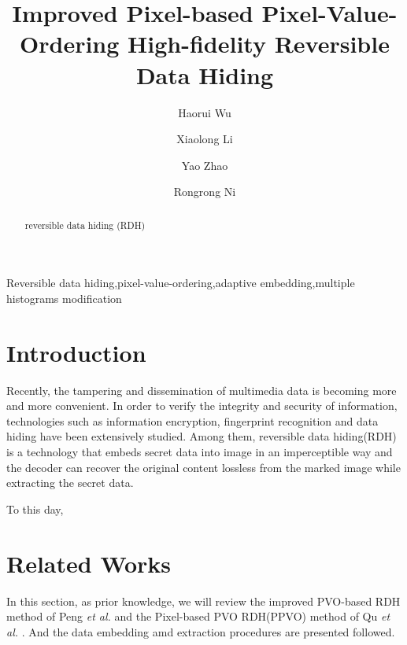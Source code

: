 \documentclass[review,3p,10pt,sort&compress]{elsarticle}
\begin{document}
\begin{frontmatter}

\title {Improved Pixel-based Pixel-Value-Ordering High-fidelity Reversible Data Hiding}

\author{Haorui Wu}

\author{Xiaolong Li}

\author{Yao Zhao}

\author{Rongrong Ni}

\address[mymainaddress]{Institute of Information Science, Beijing Jiaotong University, Beijing 100044, China}
\address[mysecondaryaddress]{Beijing Key Laboratory of Advanced Information Science and Network Technology, Beijing 100044, China}

\begin{abstract}
reversible data hiding (RDH)
\end{abstract}


\begin{keyword}
   Reversible data hiding\sep pixel-value-ordering\sep adaptive embedding\sep multiple histograms modification
\end{keyword}

\end{frontmatter}

\section{Introduction}\label{sec:1}
Recently, the tampering and dissemination of multimedia data is becoming more and more convenient. In order to verify the integrity and security of information, technologies such as information encryption, fingerprint recognition and data hiding have been extensively studied. Among them, reversible data hiding(RDH) is a technology that embeds secret data into image in an imperceptible way and the decoder can recover the original content lossless from the marked image while extracting the secret data.

To this day, 

\section{Related Works}\label{sec:2}
In this section, as prior knowledge, we will review the improved PVO-based RDH method of Peng \emph{et al.} \cite{Peng2014IPVO} and the Pixel-based PVO RDH(PPVO) method of Qu \emph{et al.} \cite{Qu2015PPVO}. And the data embedding amd extraction procedures are presented followed.
\end{document}
